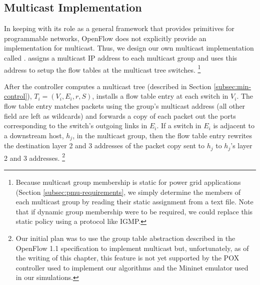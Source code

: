 \subsection{Multicast Implementation} 
\label{subsec:basic}

In keeping with its role as a general framework that provides primitives for programmable networks, OpenFlow does not explicitly provide an implementation for multicast. 
Thus, we design our own multicast implementation called \bases.  \base assigns a multicast IP address to each multicast group and uses
this address to setup the flow tables at the multicast tree switches.  
  \footnote{Because multicast group membership is static for power grid applications (Section \ref{subsec:pmu-requirements}, 
  we simply determine the members of each multicast group by reading their static assignment from a text file.  Note that if dynamic group membership were to be required, we could 
  replace this static policy using a protocol like IGMP. }

After the controller computes a multicast tree (described in Section \ref{subsec:min-control}), $T_i = (V_i,E_i,r,S)$, \base installs a flow table entry at each switch in $V_i$. The flow table entry
matches packets using the group's multicast address (all other field are left as wildcards) and forwards a copy of each packet out the ports corresponding to the switch's 
outgoing links in $E_i$. If a switch in $E_i$ is adjacent to a downstream host, $h_j$, in the multicast group, then the flow table entry rewrites the destination layer 2 and 3 addresses of the 
packet copy sent to $h_j$ to $h_j$'s layer 2 and 3 addresses.
\footnote{Our initial plan was to use the group table abstraction described in the OpenFlow 1.1 specification \cite{OpenFlowSpec1.1} to implement multicast but, unfortunately,
as of the writing of this chapter, this feature is not yet supported by the POX controller \cite{Pox} used to implement our algorithms and 
the Mininet emulator \cite{Lantz10} used in our simulations.}







